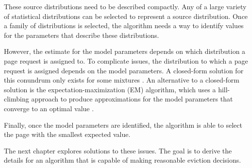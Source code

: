   These source distributions need to be described compactly. Any of a large
  variety of statistical distributions can be selected to represent a source
  distribution. Once a family of distributions is selected, the algorithm
  needs a way to identify values for the parameters that describe these
  distributions.

  However, the estimate for the model parameters depends on which distribution a
  page request is assigned to. To complicate issues, the distribution to which a
  page request is assigned depends on the model parameters. A closed-form
  solution for this conundrum only exists for some mixtures
  \cite{sundberg1974maximum}. An alternative to a closed-form solution is the
  expectation-maximization (EM) algorithm, which uses a hill-climbing approach
  to produce approximations for the model parameters that converge to an optimal
  value \cite{dempster1977maximum}.

  Finally, once the model parameters are identified, the algorithm is able
  to select the page with the smallest expected value.

  The next chapter explores solutions to these issues. The goal is to derive the
  details for an algorithm that is capable of making reasonable eviction
  decisions.

